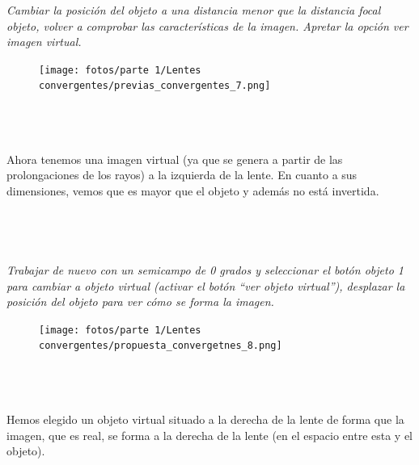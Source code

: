 \documentclass[11pt]{article}
\begin{document}
    \textit{Cambiar la posición del objeto a una distancia menor que la distancia focal objeto, volver a comprobar las características de la imagen. Apretar la opción ver imagen virtual.}

    \begin{figure}
        \centering
        \texttt{[image: fotos/parte 1/Lentes convergentes/previas\_convergentes\_7.png]}
    \end{figure}\hspace{0cm}\\

    \hspace{0cm}\\\hspace{0cm}\\\noindent Ahora tenemos una imagen virtual (ya que se genera a partir de las prolongaciones de los rayos) a la izquierda de la lente. En cuanto a sus dimensiones, vemos que es mayor que el objeto y además no está invertida.\hspace{0cm}\\\hspace{0cm}\\\hspace{0cm}\\\hspace{0cm}\\\hspace{0cm}\\       

    \textit{Trabajar de nuevo con un semicampo de 0 grados y seleccionar el botón objeto 1 para cambiar a objeto virtual (activar el botón “ver objeto virtual”), desplazar la posición del objeto para ver cómo se forma la imagen.}\\

    \begin{figure}
        \vspace{-0.75cm}
        \centering
        \texttt{[image: fotos/parte 1/Lentes convergentes/propuesta\_convergetnes\_8.png]}
    \end{figure}
    \hspace{0cm}\\\hspace{0cm}\\\hspace{0cm}\\
    Hemos elegido un objeto virtual situado a la derecha de la lente de forma que la imagen, que es real, se forma a la derecha de la lente (en el espacio entre esta y el objeto).
    
\end{document}
